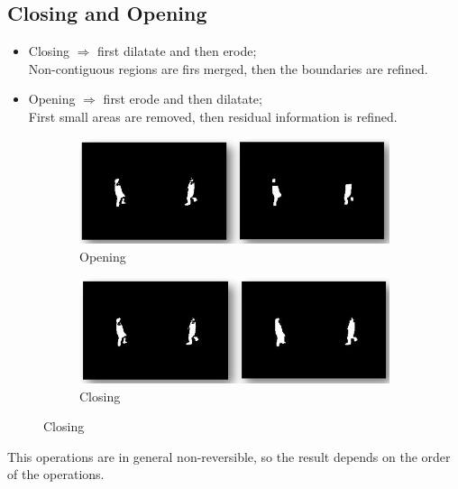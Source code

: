 \subsection{Closing and Opening}
\begin{itemize}
    \item Closing $\Rightarrow$ first dilatate and then erode; \\Non-contiguous regions are firs merged, then the boundaries are refined.
    \item Opening $\Rightarrow$ first erode and then dilatate; \\First small areas are removed, then residual information is refined.
\end{itemize}
\begin{figure}[h]
    \begin{subfigure}{0.5\textwidth}
        \includegraphics[scale=0.4]{Figures/Opening.png} 
        \caption{Opening}
        \label{fig:subim1}
    \end{subfigure}
    \begin{subfigure}{0.5\textwidth}
        \includegraphics[scale=0.4]{Figures/Closing.png}
        \caption{Closing}
        \label{fig:subim2}
    \end{subfigure}
        \label{fig:image2}
\end{figure}
This operations are in general non-reversible, so the result depends on the order of the operations.
